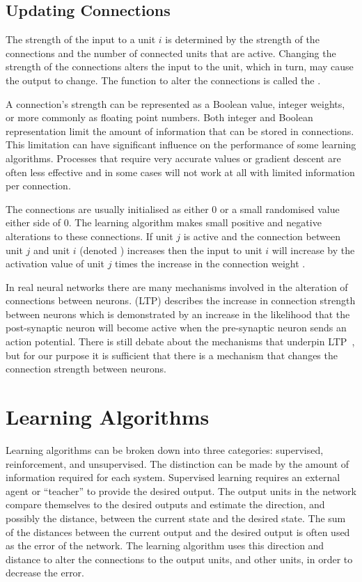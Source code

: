 \subsection{Updating Connections}
\label{sec:connections}

The strength of the input to a unit $i$ is determined by the strength of the connections and the number of connected units that are active.  Changing the strength of the connections alters the input to the unit, which in turn, may cause the output to change.  The function to alter the connections is called the . 

A connection's strength can be represented as a Boolean value, integer weights, or more commonly as floating point numbers.  Both integer and Boolean representation limit the amount of information that can be stored in connections.  This limitation can have significant influence on the performance of some learning algorithms.  Processes that require very accurate values or gradient descent are often less effective and in some cases will not work at all with limited information per connection.

The connections are usually initialised as either $0$ or a small randomised value either side of $0$.  The learning algorithm makes small positive and negative alterations to these connections.  If unit $j$ is active and the connection between unit $j$ and unit $i$ (denoted ) increases then the input to unit $i$ will increase by the activation value of unit $j$ times the increase in the connection weight .

In real neural networks there are many mechanisms involved in the alteration of connections between neurons.   (LTP) describes the increase in connection strength between neurons which is demonstrated by an increase in the likelihood that the post-synaptic neuron will become active when the pre-synaptic neuron sends an action potential.  There is still debate about the mechanisms that underpin LTP~\citep{Malenka1999,Palmer2004}, but for our purpose it is sufficient that there is a mechanism that changes the connection strength between neurons.

\section{Learning Algorithms}
\label{sec:learningAlg}

Learning algorithms can be broken down into three categories: supervised, reinforcement, and unsupervised.  The distinction can be made by the amount of information required for each system.  Supervised learning requires an external agent or ``teacher'' to provide the desired output.  The output units in the network compare themselves to the desired outputs and estimate the direction, and possibly the distance, between the current state and the desired state.  The sum of the distances between the current output and the desired output is often used as the error of the network.  The learning algorithm uses this direction and distance to alter the connections to the output units, and other units, in order to decrease the error.  


